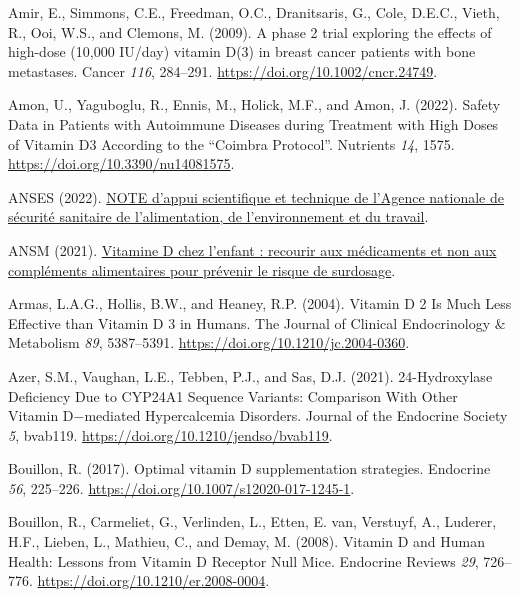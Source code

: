 \documentclass[
  a4paper,
  DIV=11,
  numbers=noendperiod,
  listof=totoc]{scrreprt}
\newlength{\cslhangindent}
\newlength{\cslentryspacingunit} %
\newenvironment{CSLReferences}[2] %
 {%
  \setlength{\parindent}{0pt}
  \ifodd #1
  \let\oldpar\par
  \def\par{\hangindent=\cslhangindent\oldpar}
  \fi
  \setlength{\parskip}{#2\cslentryspacingunit}
 }%
 {}
\begin{document}
\hypertarget{refs}{}
\begin{CSLReferences}{0}{0}
\leavevmode{}%
Amir, E., Simmons, C.E., Freedman, O.C., Dranitsaris, G., Cole, D.E.C.,
Vieth, R., Ooi, W.S., and Clemons, M. (2009). {A phase 2 trial exploring
the effects of high-dose (10,000 IU/day) vitamin D(3) in breast cancer
patients with bone metastases.} Cancer \emph{116}, 284--291.
\url{https://doi.org/10.1002/cncr.24749}.

\leavevmode{}%
Amon, U., Yaguboglu, R., Ennis, M., Holick, M.F., and Amon, J. (2022).
{Safety Data in Patients with Autoimmune Diseases during Treatment with
High Doses of Vitamin D3 According to the {``Coimbra Protocol''}}.
Nutrients \emph{14}, 1575. \url{https://doi.org/10.3390/nu14081575}.

\leavevmode{}%
ANSES (2022).
\href{https://www.anses.fr/fr/system/files/NUT2022AST0099.pdf}{{NOTE
d'appui scientifique et technique de l'Agence nationale de sécurité
sanitaire de l'alimentation, de l'environnement et du travail}}.

\leavevmode{}%
ANSM (2021).
\href{https://ansm.sante.fr/actualites/vitamine-d-chez-lenfant-recourir-aux-medicaments-et-non-aux-complements-alimentaires-pour-prevenir-le-risque-de-surdosage}{{Vitamine
D chez l'enfant : recourir aux médicaments et non aux compléments
alimentaires pour prévenir le risque de surdosage}}.

\leavevmode{}%
Armas, L.A.G., Hollis, B.W., and Heaney, R.P. (2004). {Vitamin D 2 Is
Much Less Effective than Vitamin D 3 in Humans}. The Journal of Clinical
Endocrinology \& Metabolism \emph{89}, 5387--5391.
\url{https://doi.org/10.1210/jc.2004-0360}.

\leavevmode{}%
Azer, S.M., Vaughan, L.E., Tebben, P.J., and Sas, D.J. (2021).
{24-Hydroxylase Deficiency Due to CYP24A1 Sequence Variants: Comparison
With Other Vitamin D−mediated Hypercalcemia Disorders}. Journal of the
Endocrine Society \emph{5}, bvab119.
\url{https://doi.org/10.1210/jendso/bvab119}.

\leavevmode{}%
Bouillon, R. (2017). {Optimal vitamin D supplementation strategies}.
Endocrine \emph{56}, 225--226.
\url{https://doi.org/10.1007/s12020-017-1245-1}.

\leavevmode{}%
Bouillon, R., Carmeliet, G., Verlinden, L., Etten, E. van, Verstuyf, A.,
Luderer, H.F., Lieben, L., Mathieu, C., and Demay, M. (2008). {Vitamin D
and Human Health: Lessons from Vitamin D Receptor Null Mice}. Endocrine
Reviews \emph{29}, 726--776. \url{https://doi.org/10.1210/er.2008-0004}.


\end{CSLReferences}
\end{document}
